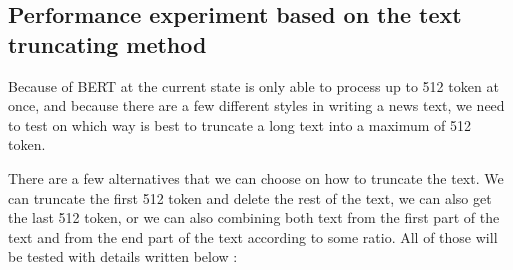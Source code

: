 \subsection{Performance experiment based on the text truncating method}

Because of BERT at the current state is only able to process up to 512 token at once, and because there are a few different styles in writing a news text, we need to test on which way is best to truncate a long text into a maximum of 512 token.

There are a few alternatives that we can choose on how to truncate the text. We can truncate the first 512 token and delete the rest of the text, we can also get the last 512 token, or we can also combining both text from the first part of the text and from the end part of the text according to some ratio. All of those will be tested with details written below :

